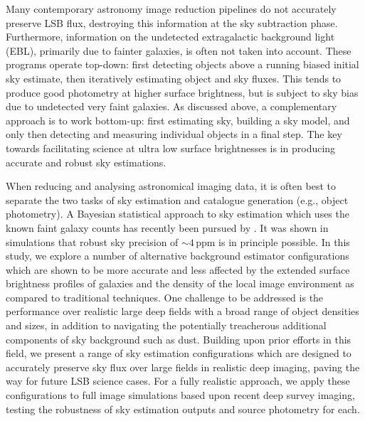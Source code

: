 \documentclass[fleqn,usenatbib,useAMS]{mnras}
\newcommand*{\about}{\mathord\sim}
\begin{document}
Many contemporary astronomy image reduction pipelines do not accurately preserve LSB flux, destroying this information at the sky subtraction phase. Furthermore, information on the undetected extragalactic background light (EBL), primarily due to fainter galaxies, is often not taken into account. These programs operate top-down: first detecting objects above a running biased initial sky estimate, then iteratively estimating object and sky fluxes. This tends to produce good photometry at higher surface brightness, but is subject to sky bias due to undetected very faint galaxies. As discussed above, a complementary approach is to work bottom-up: first estimating sky, building a sky model, and only then detecting and measuring individual objects in a final step. The key towards facilitating science at ultra low surface brightnesses is in producing accurate and robust sky estimations. 

When reducing and analysing astronomical imaging data, it is often best to separate the two tasks of sky estimation and catalogue generation (e.g., object photometry). A Bayesian statistical approach to sky estimation which uses the known faint galaxy counts has recently been pursued by \cite{Ji2018}. It was shown in simulations that robust sky precision of $\about4\,\mathrm{ppm}$ is in principle possible. In this study, we explore a number of alternative background estimator configurations which are shown to be more accurate and less affected by the extended surface brightness profiles of galaxies and the density of the local image environment as compared to traditional techniques. One challenge to be addressed is the performance over realistic large deep fields with a broad range of object densities and sizes, in addition to navigating the potentially treacherous additional components of sky background such as dust. Building upon prior efforts in this field, we present a range of sky estimation configurations which are designed to accurately preserve sky flux over large fields in realistic deep imaging, paving the way for future LSB science cases. For a fully realistic approach, we apply these configurations to full image simulations based upon recent deep survey imaging, testing the robustness of sky estimation outputs and source photometry for each.
\end{document}
